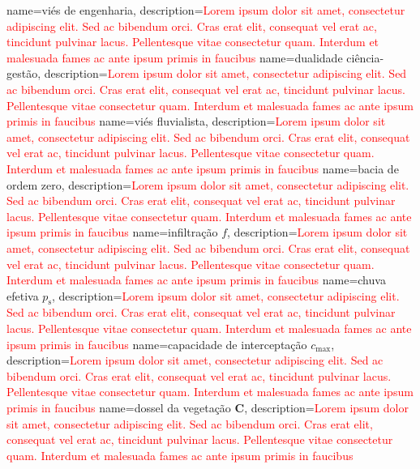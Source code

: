 {
    name=viés de engenharia,
    description={\textcolor{red}{Lorem ipsum dolor sit amet, consectetur adipiscing elit. Sed ac bibendum orci. Cras erat elit, consequat vel erat ac, tincidunt pulvinar lacus. Pellentesque vitae consectetur quam. Interdum et malesuada fames ac ante ipsum primis in faucibus}}
}
{
    name=dualidade ciência-gestão,
    description={\textcolor{red}{Lorem ipsum dolor sit amet, consectetur adipiscing elit. Sed ac bibendum orci. Cras erat elit, consequat vel erat ac, tincidunt pulvinar lacus. Pellentesque vitae consectetur quam. Interdum et malesuada fames ac ante ipsum primis in faucibus}}
}
{
    name=viés fluvialista,
    description={\textcolor{red}{Lorem ipsum dolor sit amet, consectetur adipiscing elit. Sed ac bibendum orci. Cras erat elit, consequat vel erat ac, tincidunt pulvinar lacus. Pellentesque vitae consectetur quam. Interdum et malesuada fames ac ante ipsum primis in faucibus}}
}
{
    name=bacia de ordem zero,
    description={\textcolor{red}{Lorem ipsum dolor sit amet, consectetur adipiscing elit. Sed ac bibendum orci. Cras erat elit, consequat vel erat ac, tincidunt pulvinar lacus. Pellentesque vitae consectetur quam. Interdum et malesuada fames ac ante ipsum primis in faucibus}}
}
{
    name=infiltração $f$,
    description={\textcolor{red}{Lorem ipsum dolor sit amet, consectetur adipiscing elit. Sed ac bibendum orci. Cras erat elit, consequat vel erat ac, tincidunt pulvinar lacus. Pellentesque vitae consectetur quam. Interdum et malesuada fames ac ante ipsum primis in faucibus}}
}
{
    name=chuva efetiva $p_{\text{s}}$,
    description={\textcolor{red}{Lorem ipsum dolor sit amet, consectetur adipiscing elit. Sed ac bibendum orci. Cras erat elit, consequat vel erat ac, tincidunt pulvinar lacus. Pellentesque vitae consectetur quam. Interdum et malesuada fames ac ante ipsum primis in faucibus}}
}
{
    name=capacidade de interceptação $c_{\text{max}}$,
    description={\textcolor{red}{Lorem ipsum dolor sit amet, consectetur adipiscing elit. Sed ac bibendum orci. Cras erat elit, consequat vel erat ac, tincidunt pulvinar lacus. Pellentesque vitae consectetur quam. Interdum et malesuada fames ac ante ipsum primis in faucibus}}
}
{
    name=dossel da vegetação $\textbf{C}$,
    description={\textcolor{red}{Lorem ipsum dolor sit amet, consectetur adipiscing elit. Sed ac bibendum orci. Cras erat elit, consequat vel erat ac, tincidunt pulvinar lacus. Pellentesque vitae consectetur quam. Interdum et malesuada fames ac ante ipsum primis in faucibus}}
}
